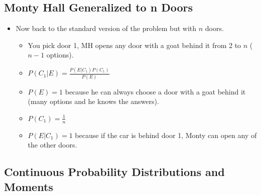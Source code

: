 \subsection{Monty Hall Generalized to n Doors}

\begin{itemize}
      \item Now back to the standard version of the problem but with $n$ doors.
            \begin{itemize}
                  \item You pick door 1, MH opens any door with a goat behind it from 2 to $n$ ($n-1$ options).
                  \item $P(C_1 | E) = \frac{P(E | C_1) P(C_1)}{P(E)}$
                  \item $P(E) = 1$ because he can always choose a door with a goat behind it (many options and he knows the answers).
                  \item $P(C_1) = \frac{1}{n}$
                  \item $P(E | C_1) = 1$ because if the car is behind door 1, Monty can open any of the other doors.
            \end{itemize}
\end{itemize}

\subsection{Continuous Probability Distributions and Moments}

